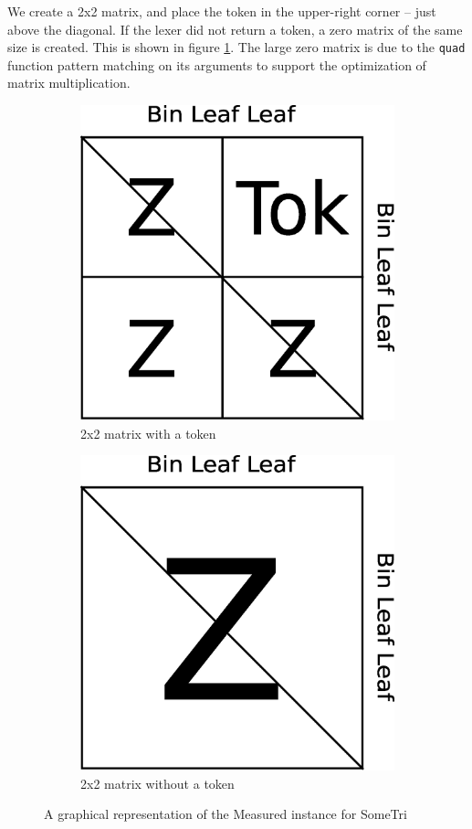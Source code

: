 \documentclass[a4paper,12pt,twosided]{report}
\begin{document}
We create a 2x2 matrix, and place the token in the upper-right corner -- just
above the diagonal. If the lexer did not return a token, a zero matrix of the
same size is created. This is shown in figure \ref{measurematrix}. The large
zero matrix is due to the \texttt{quad} function pattern matching on its
arguments to support the optimization of matrix multiplication.

\begin{figure}[H]
\centering
\begin{subfigure}[H]{.4\textwidth}
\includegraphics[width=.9\textwidth]{matrix2x2-token.eps}
\caption{2x2 matrix with a token}
\end{subfigure}
\begin{subfigure}[H]{.4\textwidth}
\includegraphics[width=.9\textwidth]{matrix2x2-zero.eps}
\caption{2x2 matrix without a token}
\end{subfigure}
\caption{\label{measurematrix} A graphical representation of the Measured
instance for SomeTri}
\end{figure}
\end{document}
